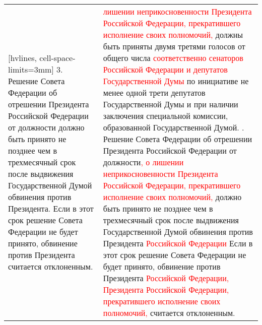 \documentclass[a4paper,14pt]{extarticle}
\begin{document}
	\pagebreak
	\noindent
	\begin{NiceTabular}{p{92mm}p{91mm}}[hvlines, cell-space-limits=3mm]
		3. Решение Совета Федерации об отрешении Президента Российской Федерации от должности должно быть принято не позднее чем в трехмесячный срок после выдвижения Государственной Думой обвинения против Президента. Если в этот срок решение Совета Федерации не будет принято, обвинение против Президента считается отклоненным.
		&
		\textcolor{red}{лишении неприкосновенности Президента Российской Федерации, прекратившего исполнение своих полномочий,} должны быть приняты двумя третями голосов от общего числа \textcolor{red}{соответственно сенаторов Российской Федерации и депутатов Государственной Думы} по инициативе не менее одной трети депутатов Государственной Думы и при наличии заключения специальной комиссии, образованной Государственной Думой. . Решение Совета Федерации об отрешении Президента Российской Федерации от должности\textcolor{red}{, о лишении неприкосновенности Президента Российской Федерации, прекратившего исполнение своих полномочий,} должно быть принято не позднее чем в трехмесячный срок после выдвижения Государственной Думой обвинения против Президента \textcolor{red}{Российской Федерации} Если в этот срок решение Совета Федерации не будет принято, обвинение против Президента \textcolor{red}{ Российской Федерации, Президента Российской Федерации, прекратившего исполнение своих полномочий,} считается отклоненным.
	\end{NiceTabular}
	
\end{document}
